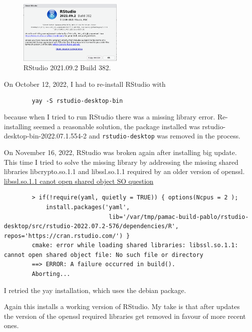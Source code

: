 \documentclass[]{scrartcl}
\begin{document}
	\begin{figure}[!htb]
		\centering
		\caption{RStudio 2021.09.2 Build 382.}
		\includegraphics[width=0.45\textwidth]{Images/RStudioSplashWindowFeb07-2022.png}
	\end{figure}
	
	On October 12, 2022, I had to re-install RStudio with
	\begin{verbatim}
		yay -S rstudio-desktop-bin
	\end{verbatim}
	
	because when I tried to run RStudio there was a missing library error. 
	Re-installing seemed a reasonable solution, the package installed was rstudio-desktop-bin-2022.07.1.554-2 and \texttt{rstudio-desktop} was removed in the process.
	
	On November 16, 2022, RStudio was broken again after installing big update.
	This time I tried to solve the missing library by addressing the missing shared
	libraries libcrypto.so.1.1  and libssl.so.1.1 required by an older version of openssl.
	\href{https://stackoverflow.com/a/72366805/1585486}{libssl.so.1.1 canot open shared object SO question}
	
	\begin{tiny}
	\begin{verbatim}
		> if(!require(yaml, quietly = TRUE)) { options(Ncpus = 2 );
		    install.packages('yaml',
			                  lib='/var/tmp/pamac-build-pablo/rstudio-desktop/src/rstudio-2022.07.2-576/dependencies/R', repos='https://cran.rstudio.com/') }
		cmake: error while loading shared libraries: libssl.so.1.1: cannot open shared object file: No such file or directory
		==> ERROR: A failure occurred in build().
		Aborting...
	\end{verbatim}
	\end{tiny}


	I retried the yay installation, which uses the debian package.
	
	
	Again this installs a working version of RStudio. My take is that after updates the version of the
	openssl required libraries get removed in favour of more recent ones. 
	
\end{document}
